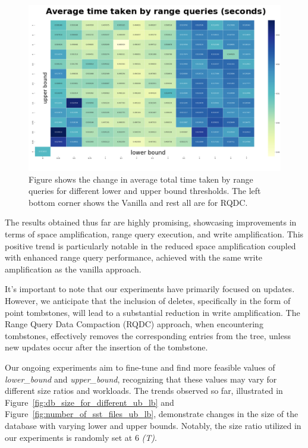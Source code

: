 \begin{figure}
    \includegraphics[width=\linewidth]{Figures/total_time_take_by_range_queries.png}
    \caption{Figure shows the change in average total time taken by range queries for different lower and upper bound 
    thresholds. The left bottom corner shows the Vanilla and rest all are for RQDC.}
\end{figure}

The results obtained thus far are highly promising, showcasing improvements in terms of space amplification, range query 
execution, and write amplification. This positive trend is particularly notable in the reduced space amplification 
coupled with enhanced range query performance, achieved with the same write amplification as the vanilla approach.

It's important to note that our experiments have primarily focused on updates. However, we anticipate that the inclusion 
of deletes, specifically in the form of point tombstones, will lead to a substantial reduction in write amplification. 
The Range Query Data Compaction (RQDC) approach, when encountering tombstones, effectively removes the corresponding 
entries from the tree, unless new updates occur after the insertion of the tombstone.

Our ongoing experiments aim to fine-tune and find more feasible values of \textit{lower\_bound} and \textit{upper\_bound}, 
recognizing that these values may vary for different size ratios and workloads. The trends observed so far, illustrated in 
Figure~\ref{fig:db_size_for_different_ub_lb} and Figure~\ref{fig:number_of_sst_files_ub_lb}, demonstrate changes in the 
size of the database with varying lower and upper bounds. Notably, the size ratio utilized in our experiments is 
randomly set at 6 \textit{(T)}.